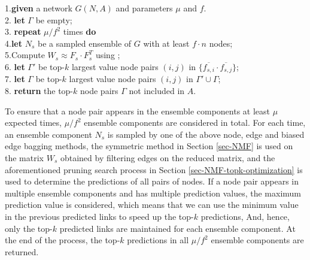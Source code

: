 \begin{tabbing}1.\hspace{1ex}\=
 {\bf given} a network $G(N, A)$ and parameters $\mu$ and $f$.\\
2.\> {\bf let} $\Gamma$ be empty;\\
3.\> {\bf repeat} $\mu/f^2$  times {\bf do} \\
4.\>\hspace{2ex}\= {\bf let} $N_s$ be a sampled ensemble of $G$ with at least $f\cdot n$ nodes; \\
5.\>\>Compute $W_s \approx F_s\cdot F_s^T$ using \NMF; \\
6.\>\> {\bf let} $\Gamma'$ be top-$k$ largest value node pairs $(i,j)$ in $\{\overline{f_{s,i}} \cdot \overline{f_{s,j}}\}$;\\
7.\>\> {\bf let} $\Gamma$ be top-$k$ largest value node pairs $(i,j)$ in $\Gamma'\cup\Gamma$;\\
8.\> {\bf return} the top-$k$ node pairs $\Gamma$ not included in $A$.
\end{tabbing}


To ensure that a node pair appears in the ensemble components at least $\mu$ expected times,  $\mu / f^{2}$ ensemble components are considered in total.
For each time, an ensemble component $N_s$ is sampled by one of the above
node, edge and biased edge bagging methods, the symmetric \NMF method in Section \ref{sec-NMF} is used on the matrix $W_s$ obtained
by filtering edges on the reduced matrix, and the aforementioned
pruning search process in Section \ref{sec-NMF-topk-optimization} is used to determine the predictions of
all pairs of nodes. If a node pair appears in multiple ensemble components and has multiple
prediction values, the maximum prediction value is considered, which means that we can use the
minimum value in the previous predicted links to speed up the top-$k$ predictions,
And, hence, only the top-$k$ predicted links are maintained for each ensemble component.
At the end of the process, the top-$k$ predictions in all $\mu / f^{2}$ ensemble components are returned.

